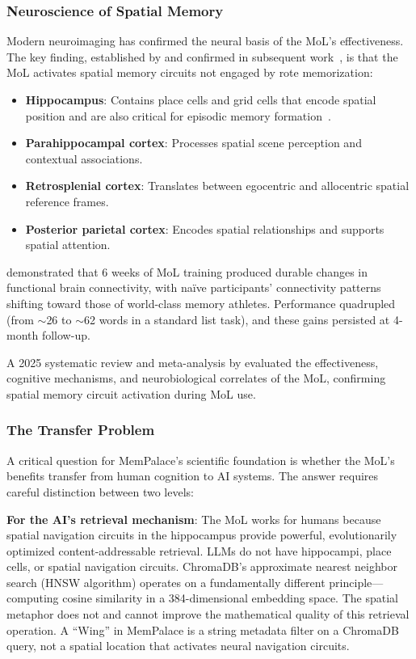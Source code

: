 \documentclass[twoside,11pt]{article}
\begin{document}
\subsubsection{Neuroscience of Spatial Memory}

Modern neuroimaging has confirmed the neural basis of the MoL's effectiveness.
The key finding, established by \citet{dresler2017} and confirmed in
subsequent work~\citep{ondrej2025}, is that the MoL activates spatial memory
circuits not engaged by rote memorization:

\begin{itemize}
\item \textbf{Hippocampus}: Contains place cells and grid cells that encode
  spatial position and are also critical for episodic memory
  formation~\citep{moser2008}.
\item \textbf{Parahippocampal cortex}: Processes spatial scene perception and
  contextual associations.
\item \textbf{Retrosplenial cortex}: Translates between egocentric and
  allocentric spatial reference frames.
\item \textbf{Posterior parietal cortex}: Encodes spatial relationships and
  supports spatial attention.
\end{itemize}

\citet{dresler2017} demonstrated that 6 weeks of MoL training produced durable
changes in functional brain connectivity, with na{\"i}ve participants'
connectivity patterns shifting toward those of world-class memory athletes.
Performance quadrupled (from $\sim$26 to $\sim$62 words in a standard list
task), and these gains persisted at 4-month follow-up.

A 2025 systematic review and meta-analysis by \citet{ondrej2025} evaluated
the effectiveness, cognitive mechanisms, and neurobiological correlates of the
MoL, confirming spatial memory circuit activation during MoL use.

\subsubsection{The Transfer Problem}
\label{sec:transfer}

A critical question for MemPalace's scientific foundation is whether the MoL's
benefits transfer from human cognition to AI systems.  The answer requires
careful distinction between two levels:

\textbf{For the AI's retrieval mechanism}: The MoL works for humans because
spatial navigation circuits in the hippocampus provide powerful,
evolutionarily optimized content-addressable retrieval.  LLMs do not have
hippocampi, place cells, or spatial navigation circuits.  ChromaDB's
approximate nearest neighbor search (HNSW algorithm) operates on a
fundamentally different principle---computing cosine similarity in a
384-dimensional embedding space.  The spatial metaphor does not and cannot
improve the mathematical quality of this retrieval operation.  A ``Wing'' in
MemPalace is a string metadata filter on a ChromaDB query, not a spatial
location that activates neural navigation circuits.
\end{document}
